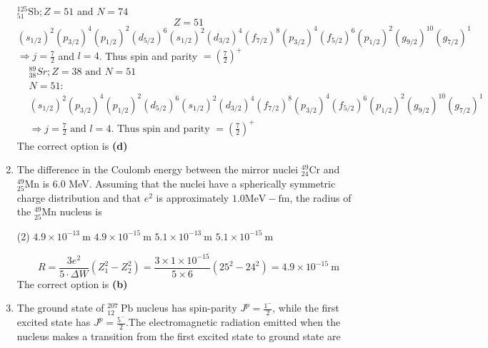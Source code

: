 \begin{enumerate}
\begin{tasks}
\end{tasks}
\begin{answer}
	${ }_{51}^{125} \mathrm{Sb} ; Z=51$ and $N=74$
	$$
	Z=51
	$$
	$$
	\left(s_{1 / 2}\right)^{2}\left(p_{3 / 2}\right)^{4}\left(p_{1 / 2}\right)^{2}\left(d_{5 / 2}\right)^{6}\left(s_{1 / 2}\right)^{2}\left(d_{3 / 2}\right)^{4}\left(f_{7 / 2}\right)^{8}\left(p_{3 / 2}\right)^{4}\left(f_{5 / 2}\right)^{6}\left(p_{1 / 2}\right)^{2}\left(g_{9 / 2}\right)^{10}\left(g_{7 / 2}\right)^{1}
	$$
	$\Rightarrow j=\frac{7}{2}$ and $l=4$. Thus spin and parity $=\left(\frac{7}{2}\right)^{+}$\\
	\begin{align*}
		&{ }_{38}^{89} S r ; Z=38 \text { and } N=51 \\
		&N=51: \\
		&\left(s_{1 / 2}\right)^{2}\left(p_{3 / 2}\right)^{4}\left(p_{1 / 2}\right)^{2}\left(d_{5 / 2}\right)^{6}\left(s_{1 / 2}\right)^{2}\left(d_{3 / 2}\right)^{4}\left(f_{7 / 2}\right)^{8}\left(p_{3 / 2}\right)^{4}\left(f_{5 / 2}\right)^{6}\left(p_{1 / 2}\right)^{2}\left(g_{9 / 2}\right)^{10}\left(g_{7 / 2}\right)^{1} \\
		&\Rightarrow j=\frac{7}{2} \text { and } l=4 \text {. Thus spin and parity }=\left(\frac{7}{2}\right)^{+}
	\end{align*}
	The correct option is \textbf{(d)}
\end{answer}
	\item The difference in the Coulomb energy between the mirror nuclei ${ }_{24}^{49} \mathrm{Cr}$ and ${ }_{25}^{49} \mathrm{Mn}$ is 6.0 MeV. Assuming that the nuclei have a spherically symmetric charge distribution and that $e^{2}$ is approximately $1.0 \mathrm{MeV}-\mathrm{fm}$, the radius of the ${ }_{25}^{49} \mathrm{Mn}$ nucleus is
{}\\
\begin{tasks}(2)
	\task[\textbf{A.}] $4.9 \times 10^{-13} \mathrm{~m}$
	\task[\textbf{B.}]$4.9 \times 10^{-15} \mathrm{~m}$
	\task[\textbf{C.}]$5.1 \times 10^{-13} \mathrm{~m}$
	\task[\textbf{D.}]$5.1 \times 10^{-15} \mathrm{~m}$
\end{tasks}
\begin{answer}
	$$
	R=\frac{3 e^{2}}{5 \cdot \Delta W}\left(Z_{1}^{2}-Z_{2}^{2}\right)=\frac{3 \times 1 \times 10^{-15}}{5 \times 6}\left(25^{2}-24^{2}\right)=4.9 \times 10^{-15} \mathrm{~m}
	$$
	The correct option is \textbf{(b)}
\end{answer}
	\item The ground state of ${ }_{12}^{207} \mathrm{~Pb}$ nucleus has spin-parity $J^{p}=\frac{1^{-}}{2}$, while the first excited state has $J^{p}=\frac{5^{-}}{2}$.The electromagnetic radiation emitted when the nucleus makes a transition from the first excited state to ground state are

\end{enumerate}
